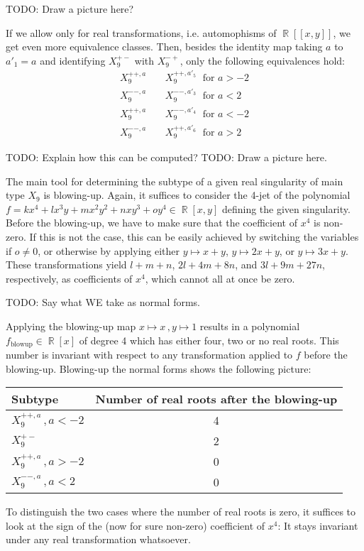 \documentclass{amsproc}
\DeclareMathOperator{\requiv}{\overset{r}{\sim}}
\DeclareMathOperator{\R}{\mathbb{R}}
\begin{document}
TODO: Draw a picture here?

If we allow only for real transformations, i.e. automophisms of $\R[[x,y]]$,
we get even more equivalence classes. Then, besides the identity map taking $a$
to $a'_1=a$ and identifying $X_9^{+-}$ with $X_9^{-+}$,
only the following equivalences hold:
\begin{align}
X_9^{++,a} \; &\requiv \; X_9^{++,a'_5} \; \text{ for } a > -2 \\
X_9^{--,a} \; &\requiv \; X_9^{--,a'_3} \; \text{ for } a < 2 \\
X_9^{++,a} \; &\requiv \; X_9^{--,a'_4} \; \text{ for } a < -2 \\
X_9^{--,a} \; &\requiv \; X_9^{++,a'_6} \; \text{ for } a > 2
\end{align}

TODO: Explain how this can be computed?
TODO: Draw a picture here.

The main tool for determining the subtype of a given real singularity of main
type $X_9$ is blowing-up. Again, it suffices to consider the 4-jet of the
polynomial $f = kx^4 + lx^3y + mx^2y^2 + nxy^3 + oy^4 \in \R[x, y]$ defining
the given singularity. Before the blowing-up, we have to make sure that the
coefficient of $x^4$ is non-zero. If this is not
the case, this can be easily achieved by switching the variables if
$o \neq 0$, or otherwise by applying either $y \mapsto x+y$, $y \mapsto 2x+y$,
or $y \mapsto 3x+y$. These transformations yield $l+m+n$, $2l+4m+8n$, and
$3l+9m+27n$, respectively, as coefficients of $x^4$, which cannot all at once
be zero.

TODO: Say what WE take as normal forms.

Applying the blowing-up map $x \mapsto x \,, y \mapsto 1$ results in a
polynomial $f_{\text{blowup}} \in \R[x]$ of degree 4 which has either four, two
or no real roots. This number is invariant with respect to any transformation
applied to $f$ before the blowing-up. Blowing-up the normal forms shows the
following picture:

\begin{tabular}{l|c}
Subtype & Number of real roots after the blowing-up \\ \hline
$X_9^{++,a} \,, a < -2$ & 4 \\
$X_9^{+-}$ & 2 \\
$X_9^{++,a} \,, a > -2$ & 0 \\
$X_9^{--,a} \,, a < 2$ & 0
\end{tabular}

To distinguish the two cases where the number of real roots is zero, it suffices
to look at the sign of the (now for sure non-zero) coefficient of $x^4$: It
stays invariant under any real transformation whatsoever.
\end{document}
